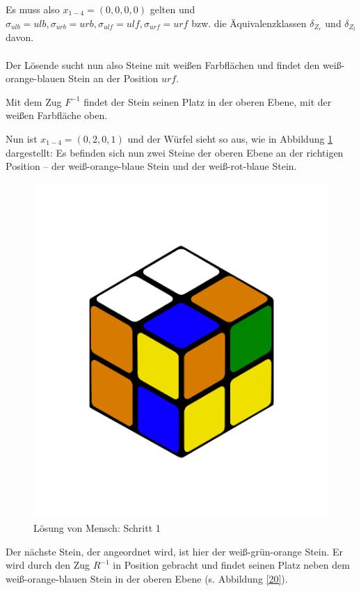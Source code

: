 \documentclass[12pt,a4paper, usenames, dvipsnames]{article}
\begin{document}
Es muss also $x_{1-4} = (0,0,0,0)$ gelten und $\sigma_{ulb}=ulb, \sigma_{urb} = urb, \sigma_{ulf} = ulf, \sigma_{urf}=urf$ bzw. die Äquivalenzklassen $\delta_{Z_r}$ und $\delta_{Z_l}$ davon. \\
\\
Der Lösende sucht nun also Steine mit weißen Farbflächen und findet den weiß-orange-blauen Stein an der Position $urf$. 

Mit dem Zug $F^{-1}$ findet der Stein seinen Platz in der oberen Ebene, mit der weißen Farbfläche oben. 

Nun ist $x_{1-4}=(0,2,0,1)$ und der Würfel sieht so aus, wie in Abbildung \ref{19} dargestellt: Es befinden sich nun zwei Steine der oberen Ebene an der richtigen Position -- der weiß-orange-blaue Stein und der weiß-rot-blaue Stein.

\begin{figure}[h]
\centering
\includegraphics[scale=0.12]{0201.png}
\caption[Lösung von Mensch: Schritt 1]{Lösung von Mensch: Schritt 1}
\label{19}
\end{figure}

Der nächste Stein, der angeordnet wird, ist hier der weiß-grün-orange Stein. Er wird durch den Zug $R^{-1}$ in Position gebracht und findet seinen Platz neben dem weiß-orange-blauen Stein in der oberen Ebene (s. Abbildung \ref{20}).
 
\end{document}
